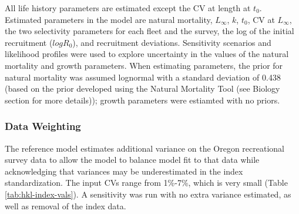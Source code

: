 \documentclass[11pt,
  english,
  a4paper,
]{article}
\begin{document}
\leavevmode\tagmcend\tagstructend


All life history parameters are estimated except the CV at length at {\(t_0\)\leavevmode\tagmcend\tagstructend}. Estimated parameters in the model are natural mortality, {\(L_{\infty}\)\leavevmode\tagmcend\tagstructend}, {\(k\)\leavevmode\tagmcend\tagstructend}, {\(t_0\)\leavevmode\tagmcend\tagstructend}, CV at {\(L_{\infty}\)\leavevmode\tagmcend\tagstructend}, the two selectivity parameters for each fleet and the survey, the log of the initial recruitment ({\(logR_0\)\leavevmode\tagmcend\tagstructend}), and recruitment deviations. Sensitivity scenarios and likelihood profiles were used to explore uncertainty in the values of the natural mortality and growth parameters. When estimating parameters, the prior for natural mortality was assumed lognormal with a standard deviation of 0.438 (based on the prior developed using the Natural Mortality Tool (see Biology section for more details)); growth parameters were estiamted with no priors.

\leavevmode\tagmcend\tagstructend\par


\hypertarget{data-weighting}{%
\subsubsection{Data Weighting}\label{data-weighting}}

\leavevmode\tagmcend\tagstructend


The reference model estimates additional variance on the Oregon recreational survey data to allow the model to balance model fit to that data while acknowledging that variances may be underestimated in the index standardization. The input CVs range from 1\%-7\%, which is very small (Table \ref{tab:hkl-index-vals}). A sensitivity was run with no extra variance estimated, as well as removal of the index data.

\leavevmode\tagmcend\tagstructend\par
\end{document}
